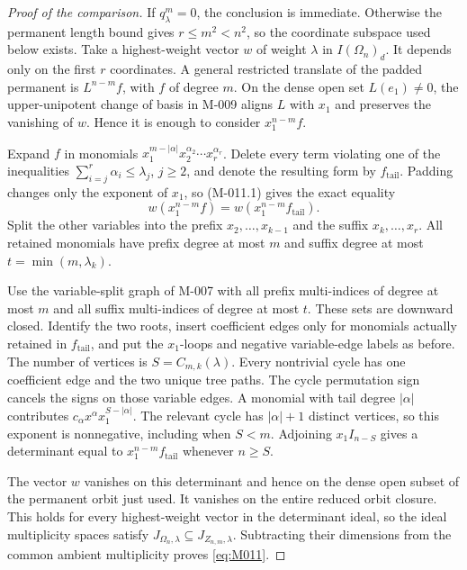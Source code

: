 \begin{proof}[Proof of the comparison]
If \(q^m_\lambda=0\), the conclusion is immediate. Otherwise
the permanent length bound gives \(r\leq m^2<n^2\), so
the coordinate subspace used below exists.
Take a highest-weight vector \(w\) of weight \(\lambda\) in
\(I(\Omega_n)_d\). It depends only on the first \(r\)
coordinates. A general restricted translate of the padded
permanent is \(L^{n-m}f\), with \(f\) of degree \(m\).
On the dense open set \(L(e_1)\ne0\), the upper-unipotent
change of basis in M-009 aligns \(L\) with \(x_1\) and
preserves the vanishing of \(w\). Hence it is enough to
consider \(x_1^{n-m}f\).

Expand \(f\) in monomials
\(x_1^{m-|\alpha|}x_2^{\alpha_2}\cdots x_r^{\alpha_r}\).
Delete every term violating one of the inequalities
\(\sum_{i=j}^r\alpha_i\leq\lambda_j\), \(j\geq2\),
and denote the resulting form by \(f_{\mathrm{tail}}\).
Padding changes only the exponent of \(x_1\), so (M-011.1)
gives the exact equality
\[
 w(x_1^{n-m}f)=w(x_1^{n-m}f_{\mathrm{tail}}).
\]
Split the other variables into the prefix
\(x_2,\ldots,x_{k-1}\) and the suffix \(x_k,\ldots,x_r\).
All retained monomials have prefix degree at most \(m\)
and suffix degree at most \(t=\min(m,\lambda_k)\).

Use the variable-split graph of M-007 with all prefix
multi-indices of degree at most \(m\) and all suffix
multi-indices of degree at most \(t\). These sets are
downward closed. Identify the two roots, insert coefficient
edges only for monomials actually retained in
\(f_{\mathrm{tail}}\), and put the \(x_1\)-loops and
negative variable-edge labels as before. The number of vertices
is \(S=C_{m,k}(\lambda)\). Every nontrivial cycle has one
coefficient edge and the two unique tree paths. The cycle
permutation sign cancels the signs on those variable edges.
A monomial with tail degree \(|\alpha|\) contributes
\(c_\alpha x^\alpha x_1^{S-|\alpha|}\).
The relevant cycle has \(|\alpha|+1\) distinct vertices,
so this exponent is nonnegative, including when \(S<m\).
Adjoining \(x_1 I_{n-S}\) gives a determinant equal to
\(x_1^{n-m}f_{\mathrm{tail}}\) whenever \(n\geq S\).

The vector \(w\) vanishes on this determinant and hence
on the dense open subset of the permanent orbit just used.
It vanishes on the entire reduced orbit closure. This holds
for every highest-weight vector in the determinant ideal,
so the ideal multiplicity spaces satisfy
\(J_{\Omega_n,\lambda}\subseteq J_{Z_{n,m},\lambda}\).
Subtracting their dimensions from the common ambient
multiplicity proves \eqref{eq:M011}.
\end{proof}

